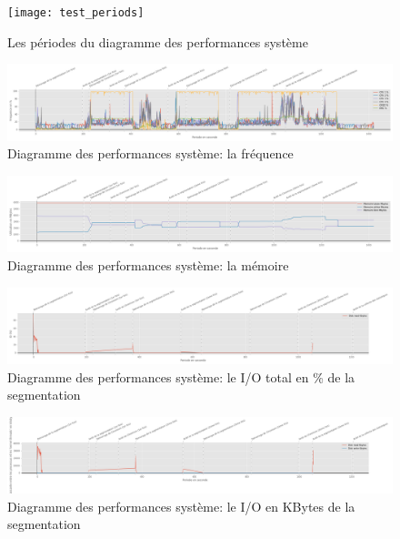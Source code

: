 \begin{figure}[H]
   \centering
   \texttt{[image: test\_periods]}
   \caption{Les périodes du diagramme des performances système}
   \label{fig:test_periods}
\end{figure}
{
   \begin{landscape}
   \begin{figure}[H]
      \centering
      \includegraphics[width=1.5\textwidth]{frequency_usage}
      \caption{Diagramme des performances système: la fréquence}
      \label{fig:frequency_usage}
   \end{figure}
   \begin{figure}[H]
      \centering
      \includegraphics[width=1.5\textwidth]{memory_usage}
      \caption{Diagramme des performances système: la mémoire}
      \label{fig:memory_usage}
   \end{figure} 
   \begin{figure}[H]
      \centering
      \includegraphics[width=1.5\textwidth]{io}
      \caption{Diagramme des performances système: le I/O total en \% de la segmentation}
      \label{fig:io}
   \end{figure}
   \begin{figure}[H]
      \centering
      \includegraphics[width=1.5\textwidth]{io_segnetcamera}
      \caption{Diagramme des performances système: le I/O en KBytes de la segmentation}

\end{figure}
\end{landscape}}
